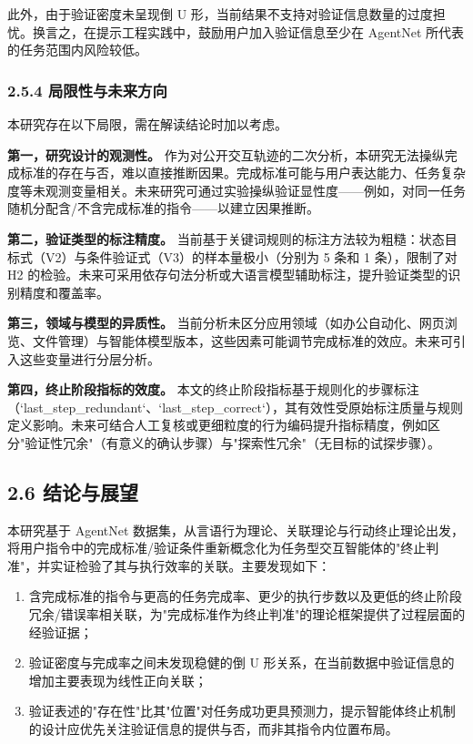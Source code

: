 \documentclass[12pt,a4paper,openany,oneside]{ctexrep}
\begin{document}
此外，由于验证密度未呈现倒 U 形，当前结果不支持对验证信息数量的过度担忧。换言之，在提示工程实践中，鼓励用户加入验证信息至少在 AgentNet 所代表的任务范围内风险较低。

\subsubsection{2.5.4 局限性与未来方向}


本研究存在以下局限，需在解读结论时加以考虑。

\textbf{第一，研究设计的观测性。} 作为对公开交互轨迹的二次分析，本研究无法操纵完成标准的存在与否，难以直接推断因果。完成标准可能与用户表达能力、任务复杂度等未观测变量相关。未来研究可通过实验操纵验证显性度——例如，对同一任务随机分配含/不含完成标准的指令——以建立因果推断。

\textbf{第二，验证类型的标注精度。} 当前基于关键词规则的标注方法较为粗糙：状态目标式（V2）与条件验证式（V3）的样本量极小（分别为 5 条和 1 条），限制了对 H2 的检验。未来可采用依存句法分析或大语言模型辅助标注，提升验证类型的识别精度和覆盖率。

\textbf{第三，领域与模型的异质性。} 当前分析未区分应用领域（如办公自动化、网页浏览、文件管理）与智能体模型版本，这些因素可能调节完成标准的效应。未来可引入这些变量进行分层分析。

\textbf{第四，终止阶段指标的效度。} 本文的终止阶段指标基于规则化的步骤标注（`last\_step\_redundant`、`last\_step\_correct`），其有效性受原始标注质量与规则定义影响。未来可结合人工复核或更细粒度的行为编码提升指标精度，例如区分"验证性冗余"（有意义的确认步骤）与"探索性冗余"（无目标的试探步骤）。

\subsection{2.6 结论与展望}


本研究基于 AgentNet 数据集，从言语行为理论、关联理论与行动终止理论出发，将用户指令中的完成标准/验证条件重新概念化为任务型交互智能体的"终止判准"，并实证检验了其与执行效率的关联。主要发现如下：

\begin{enumerate}
\item[1.] 含完成标准的指令与更高的任务完成率、更少的执行步数以及更低的终止阶段冗余/错误率相关联，为"完成标准作为终止判准"的理论框架提供了过程层面的经验证据；
\item[2.] 验证密度与完成率之间未发现稳健的倒 U 形关系，在当前数据中验证信息的增加主要表现为线性正向关联；
\item[3.] 验证表述的"存在性"比其"位置"对任务成功更具预测力，提示智能体终止机制的设计应优先关注验证信息的提供与否，而非其指令内位置布局。
\end{enumerate}
\end{document}

